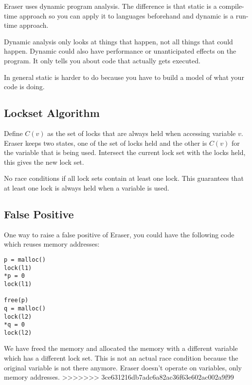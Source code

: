 \documentclass[psamsfonts]{amsart}
\begin{document}
Eraser uses dynamic program analysis. The difference is that static is a compile-time approach so you can apply it to languages beforehand and dynamic is a run-time approach.

Dynamic analysis only looks at things that happen, not all things that could happen. Dynamic could also have performance or unanticipated effects on the program. It only tells you about code that actually gets executed.

In general static is harder to do because you have to build a model of what your code is doing.

\subsection{Lockset Algorithm}

Define $C(v)$ as the set of locks that are always held when accessing variable $v$. Eraser keeps two states, one of the set of locks held and the other is $C(v)$ for the variable that is being used. Intersect the current lock set with the locks held, this gives the new lock set.

No race conditions if all lock sets contain at least one lock. This guarantees that at least one lock is always held when a variable is used.

\subsection{False Positive}

One way to raise a false positive of Eraser, you could have the following code which reuses memory addresses:

\begin{verbatim}
p = malloc()
lock(l1)
*p = 0
lock(l1)

free(p)
q = malloc()
lock(l2)
*q = 0
lock(l2)
\end{verbatim}

We have freed the memory and allocated the memory with a different variable which has a different lock set. This is not an actual race condition because the original variable is not there anymore. Eraser doesn't operate on variables, only memory addresses.
>>>>>>> 3ce631216db7adc6a82ac36f63e602ac002a9f99
\end{document}
